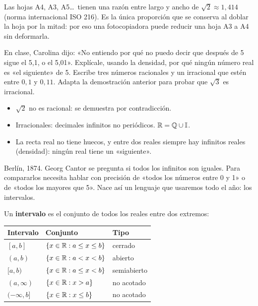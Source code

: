 \documentclass[11pt]{article}
\begin{document}
\begin{aplicacion}[La hoja A4]
Las hojas A4, A3, A5\ldots\ tienen una razón entre largo y ancho de
$\sqrt{2} \approx 1{,}414$ (norma internacional ISO 216). Es la única proporción que se
conserva al doblar la hoja por la mitad: por eso una fotocopiadora puede reducir
una hoja A3 a A4 sin deformarla.
\end{aplicacion}

\begin{preguntas}
\pregunta En clase, Carolina dijo: «No entiendo por qué no puedo decir que después
de 5 sigue el 5,1, o el 5,01». Explícale, usando la densidad, por qué ningún
número real es «el siguiente» de 5.
\pregunta Escribe tres números racionales y un irracional que estén entre
$0{,}1$ y $0{,}11$.
\espacio{2cm}
\pregunta Adapta la demostración anterior para probar que $\sqrt{3}$ es irracional.
\espacio{3.5cm}
\end{preguntas}

\begin{resumen}
\begin{itemize}
  \item $\sqrt{2}$ no es racional: se demuestra por contradicción.
  \item Irracionales: decimales infinitos no periódicos. $\mathbb{R} = \mathbb{Q} \cup \mathbb{I}$.
  \item La recta real no tiene huecos, y entre dos reales siempre hay infinitos
        reales (densidad): ningún real tiene un «siguiente».
\end{itemize}
\end{resumen}

\label{tema:intervalos}

\begin{hilo}
Berlín, 1874. Georg Cantor se pregunta si todos los infinitos son iguales. Para
compararlos necesita hablar con precisión de «todos los números entre 0 y 1» o
de «todos los mayores que 5». Nace así un lenguaje que usaremos todo el año: los
intervalos.
\end{hilo}

Un \textbf{intervalo} es el conjunto de todos los reales entre dos extremos:

\begin{center}
{\renewcommand{\arraystretch}{1.4}
\begin{tabular}{lll}
  \toprule
  \textbf{Intervalo} & \textbf{Conjunto} & \textbf{Tipo}\\
  \midrule
  $[a, b]$ & $\{x \in \mathbb{R} : a \le x \le b\}$ & cerrado\\
  $(a, b)$ & $\{x \in \mathbb{R} : a < x < b\}$ & abierto\\
  $[a, b)$ & $\{x \in \mathbb{R} : a \le x < b\}$ & semiabierto\\
  $(a, \infty)$ & $\{x \in \mathbb{R} : x > a\}$ & no acotado\\
  $(-\infty, b]$ & $\{x \in \mathbb{R} : x \le b\}$ & no acotado\\
  \bottomrule
\end{tabular}}
\end{center}
\end{document}
